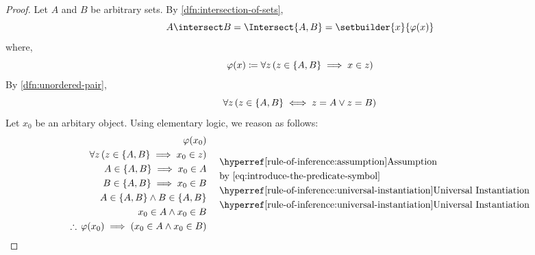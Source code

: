 \begin{proof}
    Let \( A \) and \( B \) be arbitrary sets. By \cref{dfn:intersection-of-sets},
    \begin{equation}
        \label{eq:express-A-intersect-B-using-setbuilder-notation}
        A \intersect B = \Intersect \mleft\{ A, B \mright\} =
        \setbuilder{x}{\varphi(x)}
    \end{equation}
    where,
    \begin{equation}
        \label{eq:introduce-the-predicate-symbol}
        \varphi(x) \coloneq \forall z \, \mleft( z \in
    \mleft\{ A,B \mright\} \implies x \in z \mright)
    \end{equation}
    By \cref{dfn:unordered-pair},
    \begin{equation}
        \label{eq:use-the-definition-of-unordered-pair}
        \forall z \, \mleft( z \in \mleft\{ A,B \mright\} \iff
        z = A \lor z = B \mright)
    \end{equation}
    Let \( x_{0} \) be an arbitary object. Using elementary logic, we reason as follows:
    \begin{equation*}
        \begin{aligned}
            \varphi(x_{0})& \\
            \forall z \, \mleft( z \in \mleft\{ A,B \mright\} \implies x_{0} \in z \mright)& \\
            A \in \mleft\{ A,B \mright\} \implies x_{0} \in A& \\
            B \in \mleft\{ A,B \mright\} \implies x_{0} \in B& \\
            A \in \mleft\{ A,B \mright\} \land B \in \mleft\{ A,B \mright\}& \\
            x_{0} \in A \land x_{0} \in B& \\
            \therefore \, \varphi(x_{0}) \implies \mleft( x_{0} \in A \land x_{0} \in B \mright)& \\
        \end{aligned}
        \text{  }
        \begin{aligned}
            &\quad\text{\aref{rule-of-inference:assumption}{Assumption}}\\
            &\quad\text{by \eqref{eq:introduce-the-predicate-symbol}}\\
            &\quad\text{\aref{rule-of-inference:universal-instantiation}{Universal Instantiation}}\\
            &\quad\text{\aref{rule-of-inference:universal-instantiation}{Universal Instantiation}}\\

\end{aligned}
\end{equation*}
\end{proof}
